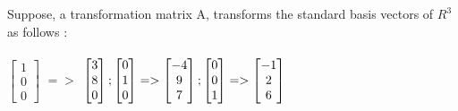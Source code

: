 \documentclass[solution,addpoints,12pt]{exam}
\begin{document}
\begin{questions}

\question Suppose, a transformation matrix A, transforms the standard basis vectors of $R^3$ as follows : \\
\\
$\begin{bmatrix}
    1  \\
    0 \\
    0
 \end{bmatrix}$
 $=>$
$\begin{bmatrix}
    3  \\
    8 \\
    0
 \end{bmatrix}
 ;
 \begin{bmatrix}
    0  \\
    1 \\
    0
 \end{bmatrix}
 =>
\begin{bmatrix}
    -4  \\
    9 \\
    7
 \end{bmatrix}
;
\begin{bmatrix}
    0  \\
    0 \\
    1
 \end{bmatrix}
 =>
\begin{bmatrix}
    -1  \\
    2 \\
    6
 \end{bmatrix}
\\$
\begin{parts}

\end{parts}
\end{questions}
\end{document}
